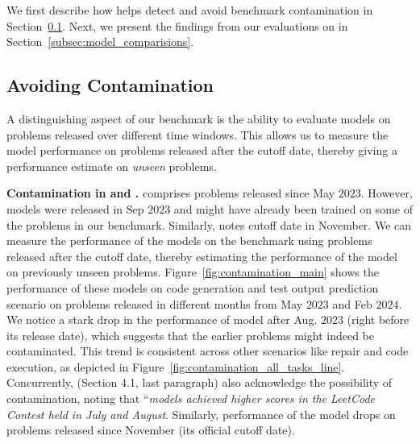 We first describe how \livecodebench{} helps detect and avoid benchmark contamination in Section~\ref{subsec:contamination}. 
Next, we present the findings from our evaluations on \livecodebench{} in Section~\ref{subsec:model_comparisions}.



\subsection{Avoiding Contamination}
\label{subsec:contamination}
A distinguishing aspect of our benchmark is the ability to evaluate models on problems released over different time windows.
This allows us to measure the model performance on problems released after the cutoff date, thereby giving a performance estimate on \textit{unseen} problems.

\vspace{1pt}
\noindent \textbf{Contamination in \deepseek{} and \gptfouro{}.}
\livecodebench{} comprises problems released since May $2023$. 
However, \deepseek{} models were released in Sep $2023$ and might have already been trained on some of the problems in our benchmark. 
Similarly, \openai{} notes \gptfouro{} cutoff date in November. 
We can measure the performance of the models on the benchmark using problems released after the cutoff date, thereby estimating the performance of the model on previously unseen problems.
Figure~\ref{fig:contamination_main} shows the performance of these models on \livecodebench{} code generation and test output prediction scenario on \leetcode{} problems released in different months from May $2023$ and Feb $2024$. 
We notice a stark drop in the performance of  model after Aug. $2023$ (right before its release date), which suggests 
that the earlier problems might indeed be contaminated.
This trend is consistent across other \livecodebench{} scenarios like repair and code execution, as depicted in Figure~\ref{fig:contamination_all_tasks_line}.
Concurrently, \citet{deepseek-coder} (Section 4.1, last paragraph) also acknowledge the possibility of \leetcode{} contamination, noting that ``\textit{models achieved higher scores in the LeetCode Contest held in July and August}.
Similarly, performance of the \gptfouro{} model drops on problems released since November (its official cutoff date).

